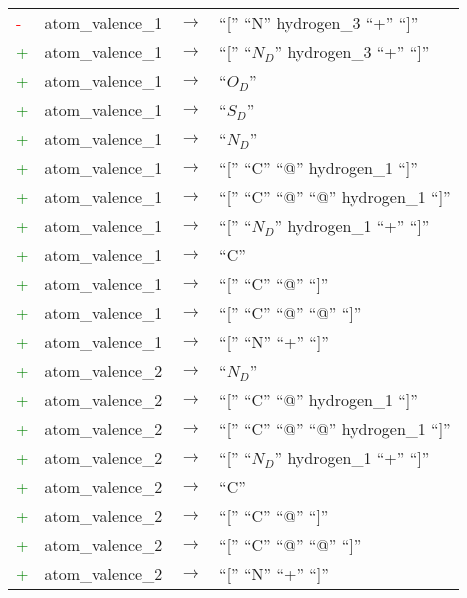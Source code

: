 \begin{longtable}{m{} m{} p{} p{}}
    \textcolor{red}{-} & atom\_valence\_1 & $\rightarrow$ & ``['' ``N'' hydrogen\_3 ``+'' ``]'' \\
    \textcolor{green}{+} & atom\_valence\_1 & $\rightarrow$ & ``['' ``$N_D$'' hydrogen\_3 ``+'' ``]'' \\
    \textcolor{green}{+} & atom\_valence\_1 & $\rightarrow$ & ``$O_D$'' \\
    \textcolor{green}{+} & atom\_valence\_1 & $\rightarrow$ & ``$S_D$'' \\
    \textcolor{green}{+} & atom\_valence\_1 & $\rightarrow$ & ``$N_D$'' \\
    \textcolor{green}{+} & atom\_valence\_1 & $\rightarrow$ & ``['' ``C'' ``@'' hydrogen\_1 ``]'' \\
    \textcolor{green}{+} & atom\_valence\_1 & $\rightarrow$ & ``['' ``C'' ``@'' ``@'' hydrogen\_1 ``]'' \\
    \textcolor{green}{+} & atom\_valence\_1 & $\rightarrow$ & ``['' ``$N_D$'' hydrogen\_1 ``+'' ``]'' \\
    \textcolor{green}{+} & atom\_valence\_1 & $\rightarrow$ & ``C'' \\
    \textcolor{green}{+} & atom\_valence\_1 & $\rightarrow$ & ``['' ``C'' ``@'' ``]'' \\
    \textcolor{green}{+} & atom\_valence\_1 & $\rightarrow$ & ``['' ``C'' ``@'' ``@'' ``]'' \\
    \textcolor{green}{+} & atom\_valence\_1 & $\rightarrow$ & ``['' ``N'' ``+'' ``]'' \\

    \textcolor{green}{+} & atom\_valence\_2 & $\rightarrow$ & ``$N_D$'' \\
    \textcolor{green}{+} & atom\_valence\_2 & $\rightarrow$ & ``['' ``C'' ``@'' hydrogen\_1 ``]'' \\
    \textcolor{green}{+} & atom\_valence\_2 & $\rightarrow$ & ``['' ``C'' ``@'' ``@'' hydrogen\_1 ``]'' \\
    \textcolor{green}{+} & atom\_valence\_2 & $\rightarrow$ & ``['' ``$N_D$'' hydrogen\_1 ``+'' ``]'' \\
    \textcolor{green}{+} & atom\_valence\_2 & $\rightarrow$ & ``C'' \\
    \textcolor{green}{+} & atom\_valence\_2 & $\rightarrow$ & ``['' ``C'' ``@'' ``]'' \\
    \textcolor{green}{+} & atom\_valence\_2 & $\rightarrow$ & ``['' ``C'' ``@'' ``@'' ``]'' \\
    \textcolor{green}{+} & atom\_valence\_2 & $\rightarrow$ & ``['' ``N'' ``+'' ``]'' \\


\end{longtable}
